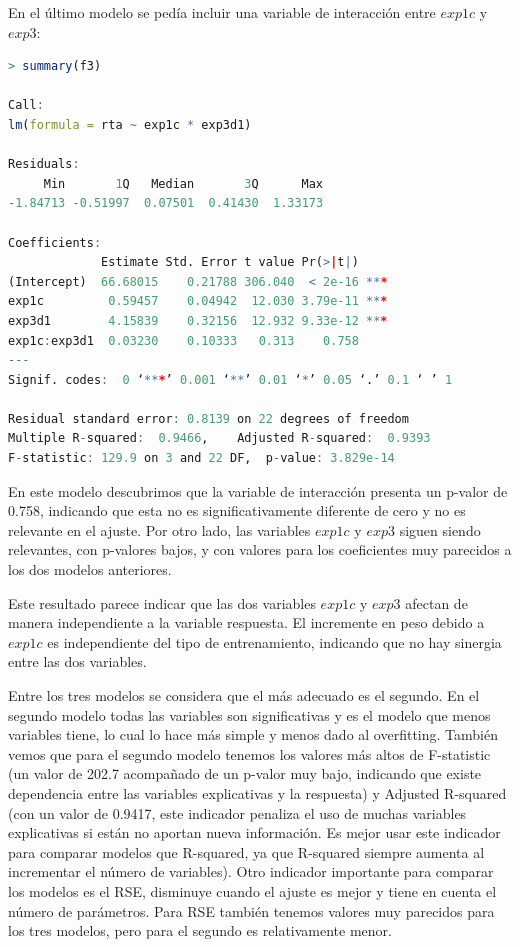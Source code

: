 \documentclass[a4paper]{article}
\begin{document}
En el último modelo se pedía incluir una variable de interacción entre $exp1c$ y $exp3$:
\begin{lstlisting}[language=R]
> summary(f3)

Call:
lm(formula = rta ~ exp1c * exp3d1)

Residuals:
     Min       1Q   Median       3Q      Max 
-1.84713 -0.51997  0.07501  0.41430  1.33173 

Coefficients:
             Estimate Std. Error t value Pr(>|t|)    
(Intercept)  66.68015    0.21788 306.040  < 2e-16 ***
exp1c         0.59457    0.04942  12.030 3.79e-11 ***
exp3d1        4.15839    0.32156  12.932 9.33e-12 ***
exp1c:exp3d1  0.03230    0.10333   0.313    0.758    
---
Signif. codes:  0 ‘***’ 0.001 ‘**’ 0.01 ‘*’ 0.05 ‘.’ 0.1 ‘ ’ 1

Residual standard error: 0.8139 on 22 degrees of freedom
Multiple R-squared:  0.9466,	Adjusted R-squared:  0.9393 
F-statistic: 129.9 on 3 and 22 DF,  p-value: 3.829e-14
\end{lstlisting}
En este modelo descubrimos que la variable de interacción presenta un p-valor de 0.758, indicando que esta no es significativamente diferente de cero y no es relevante en el ajuste. Por otro lado, las variables $exp1c$ y $exp3$ siguen siendo relevantes, con p-valores bajos, y con valores para los coeficientes muy parecidos a los dos modelos anteriores.\par
Este resultado parece indicar que las dos variables $exp1c$ y $exp3$ afectan de manera independiente a la variable respuesta. El incremente en peso debido a $exp1c$ es independiente del tipo de entrenamiento, indicando que no hay sinergia entre las dos variables.\par
Entre los tres modelos se considera que el más adecuado es el segundo. En el segundo modelo todas las variables son significativas y es el modelo que menos variables tiene, lo cual lo hace más simple y menos dado al overfitting. También vemos que para el segundo modelo tenemos los valores más altos de F-statistic (un valor de 202.7 acompañado de un p-valor muy bajo, indicando que existe dependencia entre las variables explicativas y la respuesta) y Adjusted R-squared (con un valor de 0.9417, este indicador penaliza el uso de muchas variables explicativas si están no aportan nueva información. Es mejor usar este indicador para comparar modelos que R-squared, ya que R-squared siempre aumenta al incrementar el número de variables). Otro indicador importante para comparar los modelos es el RSE, disminuye cuando el ajuste es mejor y tiene en cuenta el número de parámetros. Para RSE también tenemos valores muy parecidos para los tres modelos, pero para el segundo es relativamente menor. \par
\end{document}
